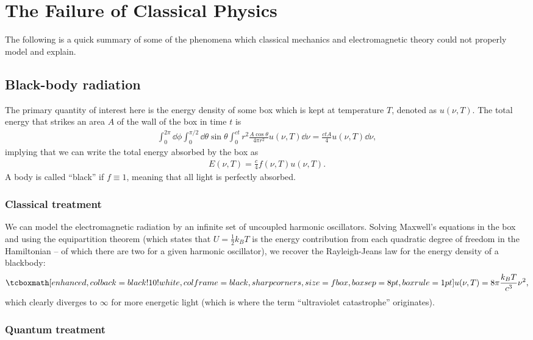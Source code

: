 \chapter{The Failure of Classical Physics}

The following is a quick summary of some of the phenomena which classical mechanics and electromagnetic theory could not properly model and explain.

\section{Black-body radiation}

The primary quantity of interest here is the energy density of some box which is kept at temperature $T$, denoted as $u(\nu,T)$.
The total energy that strikes an area $A$ of the wall of the box in time $t$ is
\begin{eqnarray}
    \int_{0}^{2 \pi} \dd{\phi} \int_{0}^{\pi/2} \dd{\theta} \sin{\theta} \int_{0}^{ct} r^2 \frac{A \cos{\theta}}{4 \pi r^2} u(\nu,T) \dd{\nu} = \frac{c t A}{4} u(\nu,T) \dd{\nu}
,\end{eqnarray}
implying that we can write the total energy absorbed by the box as
\begin{eqnarray}
    E(\nu,T) = \frac{c}{4} f(\nu,T) u(\nu,T)
.\end{eqnarray}
A body is called ``black'' if $f \equiv 1$, meaning that all light is perfectly absorbed.

\subsection{Classical treatment}

We can model the electromagnetic radiation by an infinite set of uncoupled harmonic oscillators.
Solving Maxwell's equations in the box and using the equipartition theorem (which states that $U = \frac{1}{2} k_{B} T$ is the energy contribution from each quadratic degree of freedom in the Hamiltonian -- of which there are two for a given harmonic oscillator), we recover the Rayleigh-Jeans law for the energy density of a blackbody:
\begin{eqnarray}
    \eqbox{ u(\nu,T) = 8 \pi \frac{k_{B} T}{c^3} \nu^2 }
,\end{eqnarray}
which clearly diverges to $\infty$ for more energetic light (which is where the term ``ultraviolet catastrophe'' originates).

\subsection{Quantum treatment}

